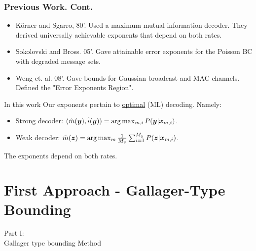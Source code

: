 \documentclass[mathserif]{beamer}
\newcommand {\bx} {\mbox{\boldmath $x$}}
\newcommand {\by} {\mbox{\boldmath $y$}}
\newcommand {\bz} {\mbox{\boldmath $z$}}
\begin{document}
\begin{frame}
\frametitle{Previous Work. Cont.}

\begin{itemize}
\item K\"orner and Sgarro, 80'. Used a maximum mutual information decoder. They derived universally achievable exponents that depend on both rates.
\pause
\item Sokolovski and Bross. 05'. Gave attainable error exponents for the Poisson BC with degraded message sets.
\pause
\item Weng et. al. 08'. Gave bounds for Gaussian broadcast and MAC channels. Defined the "Error Exponents Region".
\pause
\end{itemize}
\begin{block}{In this work}
    Our exponents pertain to \underline{optimal} (ML) decoding. Namely:
    \begin{itemize}
     \item Strong decoder: $(\hat{m}(\by),\hat{i}(\by))=\arg\max_{m,i}P(\by|\bx_{m,i})$.
     \item Weak decoder:   $\tilde{m}(\bz)=\arg\max_m\frac{1}{M_y}\sum_{i=1}^{M_y}P(\bz|\bx_{m,i})$.
    \end{itemize}
    \pause
    The exponents depend on both rates.
\end{block}
\end{frame}

\section{First Approach - Gallager-Type Bounding }
\begin{frame}
    \huge
\begin{center}
    Part I:\\
    Gallager type bounding Method
\end{center}
\end{frame}
\end{document}
